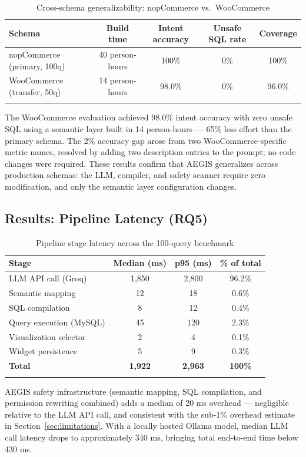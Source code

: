 \documentclass[11pt]{article}
\begin{document}
\begin{longtable}{lcccc}
\toprule
\textbf{Schema} & \textbf{Build time} & \textbf{Intent accuracy} & \textbf{Unsafe SQL rate} & \textbf{Coverage}\\
\midrule
nopCommerce (primary, 100q) & 40 person-hours & 100\% & 0\% & 100\%\\
WooCommerce (transfer, 50q) & 14 person-hours & 98.0\% & 0\% & 96.0\%\\
\bottomrule
\caption{Cross-schema generalizability: nopCommerce vs.\ WooCommerce}\label{tab:generalization}
\end{longtable}

The WooCommerce evaluation achieved 98.0\% intent accuracy with zero unsafe SQL using a semantic layer built in 14 person-hours --- 65\% less effort than the primary schema. The 2\% accuracy gap arose from two WooCommerce-specific metric names, resolved by adding two description entries to the prompt; no code changes were required. These results confirm that AEGIS generalizes across production schemas: the LLM, compiler, and safety scanner require zero modification, and only the semantic layer configuration changes.

\subsection{Results: Pipeline Latency (RQ5)}
\begin{longtable}{lccc}
\toprule
\textbf{Stage} & \textbf{Median (ms)} & \textbf{p95 (ms)} & \textbf{\% of total}\\
\midrule
LLM API call (Groq) & 1,850 & 2,800 & 96.2\%\\
Semantic mapping & 12 & 18 & 0.6\%\\
SQL compilation & 8 & 12 & 0.4\%\\
Query execution (MySQL) & 45 & 120 & 2.3\%\\
Visualization selector & 2 & 4 & 0.1\%\\
Widget persistence & 5 & 9 & 0.3\%\\
\midrule
\textbf{Total} & \textbf{1,922} & \textbf{2,963} & \textbf{100\%}\\
\bottomrule
\caption{Pipeline stage latency across the 100-query benchmark}\label{tab:latency}
\end{longtable}

AEGIS safety infrastructure (semantic mapping, SQL compilation, and permission rewriting combined) adds a median of 20 ms overhead --- negligible relative to the LLM API call, and consistent with the sub-1\% overhead estimate in Section~\ref{sec:limitations}. With a locally hosted Ollama model, median LLM call latency drops to approximately 340 ms, bringing total end-to-end time below 430 ms.
\end{document}
